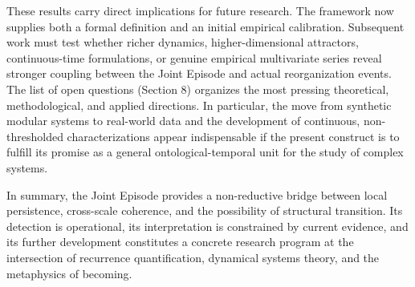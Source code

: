 These results carry direct implications for future research. The framework now supplies both a formal definition and an initial empirical calibration. Subsequent work must test whether richer dynamics, higher-dimensional attractors, continuous-time formulations, or genuine empirical multivariate series reveal stronger coupling between the Joint Episode and actual reorganization events. The list of open questions (Section 8) organizes the most pressing theoretical, methodological, and applied directions. In particular, the move from synthetic modular systems to real-world data and the development of continuous, non-thresholded characterizations appear indispensable if the present construct is to fulfill its promise as a general ontological-temporal unit for the study of complex systems.

In summary, the Joint Episode provides a non-reductive bridge between local persistence, cross-scale coherence, and the possibility of structural transition. Its detection is operational, its interpretation is constrained by current evidence, and its further development constitutes a concrete research program at the intersection of recurrence quantification, dynamical systems theory, and the metaphysics of becoming.